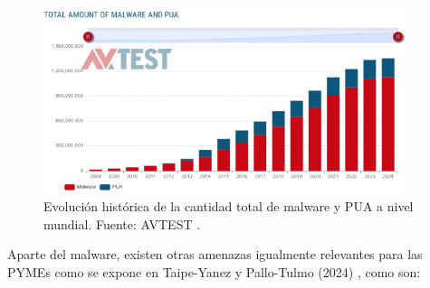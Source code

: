 \documentclass[a4paper, 11pt]{article}
\begin{document}
\vspace{0.3cm}

\begin{figure}[H]
    \centering
    \includegraphics[width=0.95\textwidth]{images/malware.png}
    \caption{Evolución histórica de la cantidad total de malware y PUA a nivel mundial. Fuente: AVTEST \cite{avtest}.}
\end{figure}

\vspace{0.5cm}

Aparte del malware, existen otras amenazas igualmente relevantes para las PYMEs como se expone en Taipe-Yanez y Pallo-Tulmo (2024) \cite{vuln}, como son: 
\par\vspace{0.5cm}
\end{document}
